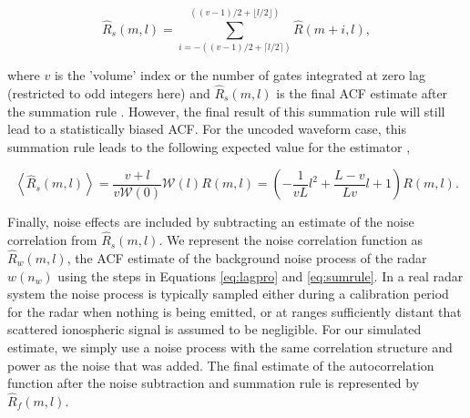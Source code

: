 \documentclass[draft,ras]{agutex}
\begin{document}
\begin{article}
\begin{equation}
\label{eq:sumrule}
\widehat{R}_s(m,l) = \displaystyle\sum\limits_{i=-((v-1)/2+\lceil l/2 \rceil)}^{((v-1)/2+\lfloor l/2\rfloor)} \widehat{R}(m+i,l),
\end{equation}

\noindent where $v$ is the 'volume' index or the number of gates integrated at zero lag (restricted to odd integers here) and $\widehat{R}_s(m,l)$ is the final ACF estimate after the summation rule \citep{nygren1996}. 
However, the final result of this summation rule will still lead to a statistically biased ACF. For the uncoded waveform case, this summation rule leads to the following expected value for the estimator \citep{nygren1996},

\begin{equation}
\label{eq:sumruleest}
\left\langle\widehat{R}_s(m,l) \right\rangle  =\frac{v+l}{v\mathcal{W}(0)}\mathcal{W}(l)R(m,l) =\left(-\frac{1}{vL}l^2+\frac{L-v}{Lv}l+1\right)   R(m,l).
\end{equation}





Finally, noise effects are included by subtracting an estimate of the noise correlation from $\widehat{R}_s(m,l)$.  We represent the noise correlation function as $\widehat{R}_w(m,l)$, the ACF estimate of the background noise process of the radar $w(n_w)$ using the steps in Equations \ref{eq:lagpro} and \ref{eq:sumrule}. In a real radar system the noise process is typically sampled either during a calibration period for the radar when nothing is being emitted, or at ranges sufficiently distant that scattered ionospheric signal is assumed to be negligible. For our simulated estimate, we simply use a noise process with the same correlation structure and power as the noise that was added. The final estimate of the autocorrelation function after the noise subtraction and summation rule is represented by $\widehat{R}_f(m,l)$.


\end{article}
\end{document}

